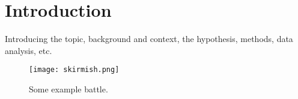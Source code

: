 \chapter{Introduction}
\label{chap.introduction}

Introducing the topic, background and context, the hypothesis, methods, data analysis, etc.~\cite{clayton-introduction}
%
\lipsum[2-3]
%
\begin{figure}
	\centering
	\texttt{[image: skirmish.png]}
	\caption{Some example battle.}
\end{figure}



